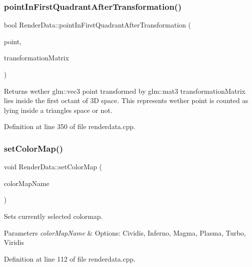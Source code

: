 \subsubsection{\texorpdfstring{point\+In\+First\+Quadrant\+After\+Transformation()}{pointInFirstQuadrantAfterTransformation()}}
{\footnotesize\ttfamily bool Render\+Data\+::point\+In\+First\+Quadrant\+After\+Transformation (\begin{DoxyParamCaption}\item[{const glm\+::vec3 \&}]{point,  }\item[{const glm\+::mat3 \&}]{transformation\+Matrix }\end{DoxyParamCaption})\hspace{0.3cm}{\ttfamily [private]}}

\begin{DoxyReturn}{Returns}
wether glm\+::vec3 point transformed by glm\+::mat3 transformation\+Matrix lies inside the first octant of 3D space. This represents wether point is counted as lying inside a triangle\textquotesingle{}s space or not. 
\end{DoxyReturn}


Definition at line 350 of file renderdata.\+cpp.

\mbox{\label{class_render_data_adb1961bf93370d67c9efb416fde8fefb}} 
\subsubsection{\texorpdfstring{set\+Color\+Map()}{setColorMap()}}
{\footnotesize\ttfamily void Render\+Data\+::set\+Color\+Map (\begin{DoxyParamCaption}\item[{Q\+String}]{color\+Map\+Name }\end{DoxyParamCaption})}

Sets currently selected colormap. 
\begin{DoxyParams}{Parameters}
{\em color\+Map\+Name} & Options\+: Cividis, Inferno, Magma, Plasma, Turbo, Viridis \\
\hline
\end{DoxyParams}


Definition at line 112 of file renderdata.\+cpp.

\mbox{\label{class_render_data_a8d5f7285d29dc9ca0f93fcf2b5826283}} 
